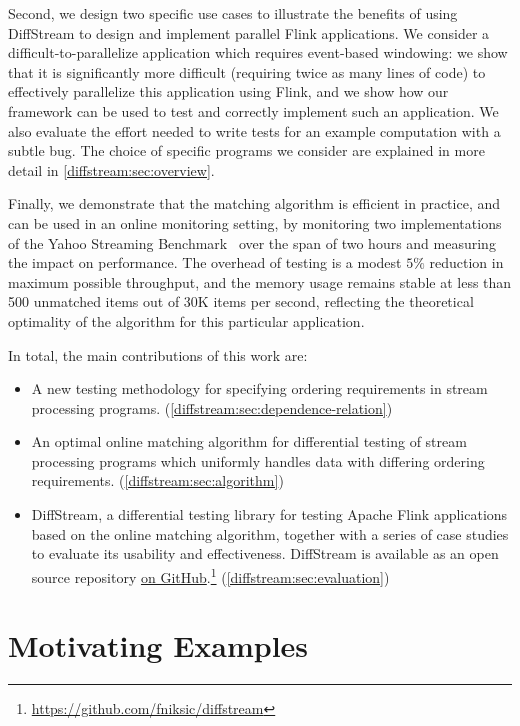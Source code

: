 Second, we design two specific use cases to illustrate the benefits of
using DiffStream to design and implement parallel Flink applications. We
consider a difficult-to-parallelize application which requires
event-based windowing: we show that it is significantly more difficult
(requiring twice as many lines of code) to effectively parallelize
this application using Flink, and we show how our framework can be
used to test and correctly implement such an application. We also
evaluate the effort needed to write tests for an example computation
with a subtle bug. The choice of specific programs we consider are explained in
more detail in \cref{diffstream:sec:overview}.

Finally, we demonstrate that the matching algorithm is efficient in
practice, and can be used in an online monitoring setting, by
monitoring two implementations of the Yahoo Streaming
Benchmark~\cite{yahoostreaming2016} over the span of two hours and measuring the impact on performance.
The overhead of testing is a modest $5\%$ reduction in maximum possible throughput, and the memory usage remains stable at less than 500 unmatched items out of 30K items per second, reflecting the theoretical optimality of the algorithm for this particular application.

In total, the main contributions of this work are:
\begin{itemize}
    \item A new testing methodology for specifying ordering
      requirements in stream processing programs. (\cref{diffstream:sec:dependence-relation})
    \item An optimal online matching algorithm for differential
      testing of stream processing programs which uniformly handles
      data with differing ordering requirements. (\cref{diffstream:sec:algorithm})
    \item DiffStream, a differential testing library for testing Apache
      Flink applications based on the online matching algorithm, together with a series of case studies to evaluate its
        usability and effectiveness.
        DiffStream is available as an open source repository \href{https://github.com/fniksic/diffstream}{on GitHub}.\footnote{\url{https://github.com/fniksic/diffstream}}
        (\cref{diffstream:sec:evaluation})
\end{itemize}

\section{Motivating Examples}
\label{diffstream:ssec:motivating-examples}
\label{diffstream:sec:overview}

